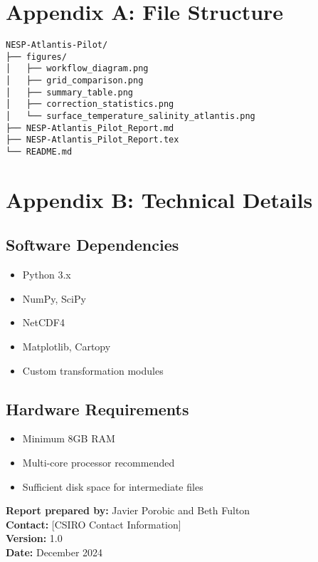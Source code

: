 \documentclass[12pt,a4paper,twoside,times,sky,formal]{csiroreport2017}
\begin{document}
\section*{Appendix A: File Structure}

\begin{verbatim}
NESP-Atlantis-Pilot/
├── figures/
│   ├── workflow_diagram.png
│   ├── grid_comparison.png
│   ├── summary_table.png
│   ├── correction_statistics.png
│   └── surface_temperature_salinity_atlantis.png
├── NESP-Atlantis_Pilot_Report.md
├── NESP-Atlantis_Pilot_Report.tex
└── README.md
\end{verbatim}

\section*{Appendix B: Technical Details}

\subsection*{Software Dependencies}
\begin{itemize}
\item Python 3.x
\item NumPy, SciPy
\item NetCDF4
\item Matplotlib, Cartopy
\item Custom transformation modules
\end{itemize}

\subsection*{Hardware Requirements}
\begin{itemize}
\item Minimum 8GB RAM
\item Multi-core processor recommended
\item Sufficient disk space for intermediate files
\end{itemize}

\vfill

\begin{center}
\textbf{Report prepared by:} Javier Porobic and Beth Fulton\\
\textbf{Contact:} [CSIRO Contact Information]\\
\textbf{Version:} 1.0\\
\textbf{Date:} December 2024
\end{center}
\end{document}
